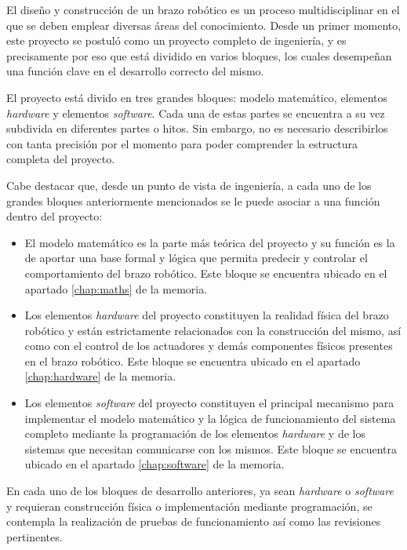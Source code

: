 El diseño y construcción de un brazo robótico es un proceso multidisciplinar en el que se deben emplear diversas áreas del conocimiento. Desde un primer momento, este proyecto se postuló como un proyecto completo de ingeniería, y es precisamente por eso que  está dividido en varios bloques, los cuales desempeñan una función clave en el desarrollo correcto del mismo.

El proyecto está divido en tres grandes bloques: modelo matemático, elementos \textit{hardware} y elementos \textit{software}. Cada una de estas partes se encuentra a su vez subdivida en diferentes partes o hitos. Sin embargo, no es necesario describirlos con tanta precisión por el momento para poder comprender la estructura completa del proyecto.

Cabe destacar que, desde un punto de vista de ingeniería, a cada uno de los grandes bloques anteriormente mencionados se le puede asociar a una función dentro del proyecto:

\begin{itemize}
    \item El modelo matemático es la parte más teórica del proyecto y su función es la de aportar una base formal y lógica que permita predecir y controlar el comportamiento del brazo robótico. Este bloque se encuentra ubicado en el apartado \ref{chap:maths} de la memoria.
    
    \item Los elementos \textit{hardware} del proyecto constituyen la realidad física del brazo robótico y están estrictamente relacionados con la construcción del mismo, así como con el control de los actuadores y demás componentes físicos presentes en el brazo robótico. Este bloque se encuentra ubicado en el apartado \ref{chap:hardware} de la memoria.
    
    \item Los elementos \textit{software} del proyecto constituyen el principal mecanismo para implementar el modelo matemático y la lógica de funcionamiento del sistema completo mediante la programación de los elementos \textit{hardware} y de los sistemas que necesitan comunicarse con los mismos. Este bloque se encuentra ubicado en el apartado \ref{chap:software} de la memoria.
\end{itemize}

En cada uno de los bloques de desarrollo anteriores, ya sean \textit{hardware} o \textit{software} y requieran construcción física o implementación mediante programación, se contempla la realización de pruebas de funcionamiento así como las revisiones pertinentes.

